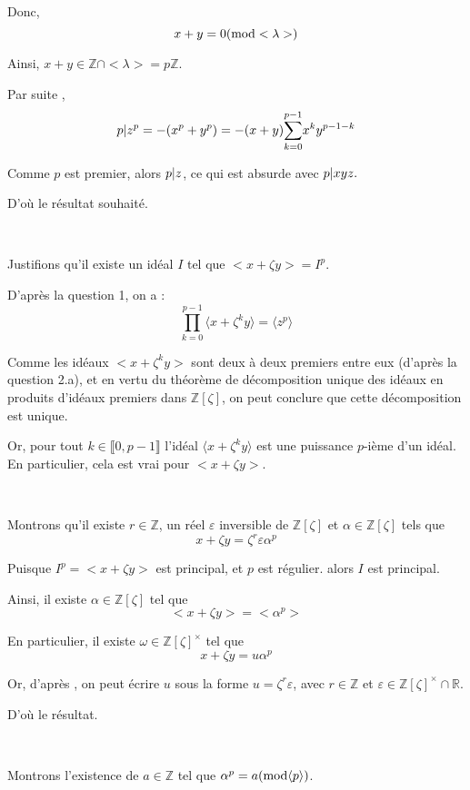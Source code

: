 Donc,
\[ x + y = 0 (\operatorname{mod} < \lambda >) \]


Ainsi, $x + y \in \mathbb{Z} \cap < \lambda > = p\mathbb{Z}$.

Par suite ,
\[ p | z^p = -  (x^p + y^p) = - (x + y) \underset{k = 0}{\overset{p
   - 1}{\sum}} x^k y^{p - 1 - k} \]


Comme $p$ est premier, alors $p | z $, ce qui est absurde avec $p |
x y z  .$

D'o{\`u} le r{\'e}sultat souhait{\'e}.

\

 Justifions qu'il existe un id{\'e}al $I$ tel que $< x + \zeta y
> = I^p$.

D'apr{\`e}s la question 1, on a :
\[ \underset{k = 0}{\overset{p - 1}{\prod}} \langle x + \zeta^k y \rangle =
   \langle z^p \rangle \]


Comme les id{\'e}aux $< x + \zeta^k y >$ sont deux {\`a} deux premiers entre
eux (d'apr{\`e}s la question 2.a), et en vertu du th{\'e}or{\`e}me de
d{\'e}composition unique des id{\'e}aux en produits d'id{\'e}aux premiers dans
$\mathbb{Z} [\zeta]$, on peut conclure que cette d{\'e}composition est unique.

Or, pour tout $k \in \llbracket 0, p - 1 \rrbracket$ l'id{\'e}al $\langle x +
\zeta^k y \rangle$ est une puissance $p$-i{\`e}me d'un id{\'e}al. En
particulier, cela est vrai pour $< x + \zeta y >$.

\

 Montrons qu'il existe $r \in \mathbb{Z}$, un r{\'e}el
$\varepsilon$ inversible de $\mathbb{Z}[\zeta]$ et $\alpha \in
\mathbb{Z}[\zeta]$ tels que
\[ x + \zeta y = \zeta^r \varepsilon \alpha^p \]


Puisque $I^p = < x + \zeta y >$ est principal, et $p$ est r{\'e}gulier. alors
$I$ est principal.

Ainsi, il existe $\alpha \in \mathbb{Z} [\zeta]$ tel que
\[ < x + \zeta y > = < \alpha^p > \]


En particulier, il existe $\omega \in \mathbb{Z} [\zeta]^{\times}$ tel que
\[ x + \zeta y = u \alpha^p \]


Or, d'apr{\`e}s , on peut {\'e}crire
$u$ sous la forme $u = \zeta^r \varepsilon$, avec $r \in \mathbb{Z}$ et
$\varepsilon \in \mathbb{Z} [\zeta]^{\times} \cap \mathbb{R}$.

D'o{\`u} le r{\'e}sultat.

\

 Montrons l'existence de $a \in \mathbb{Z}$ tel que $\alpha^p =
a (\operatorname{mod} \langle p \rangle)$.

